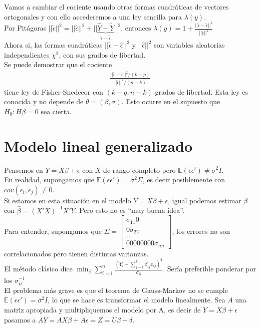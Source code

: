\documentclass[10pt]{article}
\theoremstyle{plain}
\theoremstyle{definition}
\begin{document}
Vamos a cambiar el cociente usando otras formas cuadráticas de vectores ortogonales y con ello accederemos a una ley sencilla para $\lambda (y)$.\\

Por Pitágoras $||\tilde{\epsilon}||^2 = ||\hat{\epsilon}||^2 + ||\underbrace{\hat{Y}-\tilde{Y}}_{\hat{\epsilon}-\tilde{\epsilon}}||^2$, entonces $\lambda (y) = 1+ \frac{||\hat{\epsilon}-\tilde{\epsilon}||^2}{||\hat{\epsilon}||^2}$\\

Ahora si, las formas cuadráticas $||\tilde{\epsilon}-\hat{\epsilon}||^2$ y $||\hat{\epsilon}||^2$ son variables aleatorias independientes $\chi^2$, con sus grados de libertad.\\

Se puede demostrar que el cociente
\begin{align*}
\frac{||\tilde{\epsilon}-\hat{\epsilon}||^2/(k-p)}{||\hat{\epsilon}||^2/(n-k)}
\end{align*}
tiene ley de Fisher-Snedecor con $(k-q, n-k)$ grados de libertad. Esta ley es conocida y no depende de $\theta = (\beta, \sigma)$. Esto ocurre en el supuesto que $H_{0}\colon H\beta = 0$ sea cierta.

\section{Modelo lineal generalizado}
Pensemos en $Y=X\beta+\epsilon$ con $X$ de rango completo pero $\mathbb{E}(\epsilon\epsilon') \not = \sigma^2I$.\\
En realidad, supongamos que $\mathbb{E}(\epsilon\epsilon') = \sigma^2 \Sigma$, es decir posiblemente con $cov(\epsilon_{i},\epsilon_{j}) \not = 0$.\\

Si estamos en esta situación en el modelo $Y=X\beta + \epsilon$, igual podemos estimar $\beta$ con $\hat{\beta} = (X'X)^{-1}X'Y$. Pero esto no es ``muy buena idea''.\\

Para entender, supongamos que $\Sigma = \begin{bmatrix}
\sigma_{11} 0 \\ 0 \sigma_{22} \\ \ldots \\ 00000000 \sigma_{nn}
\end{bmatrix}$, los errores no son correlacionados pero tienen distintas varianzas.\\

El método clásico dice $\min_{\beta} \sum_{i=1}^{n} \frac{(Y_{i}-\sum_{j=1}^k \beta_{ij} x_{ij})^2}{\sigma_{ii}}$. Sería preferible ponderar por los $\sigma_{ii}^{-1}$\\
El problema más grave es que el teorema de Gauss-Markov no se cumple $\mathbb{E}(\epsilon\epsilon') = \sigma^2I$, lo que se hace es transformar el modelo linealmente. Sea $A$ una matriz apropiada y multipliquemos el modelo por A, es decir de $Y=X\beta+\epsilon$ pasamos a $AY = AX\beta + A\epsilon = Z = U\beta + \delta$.\\
\end{document}
